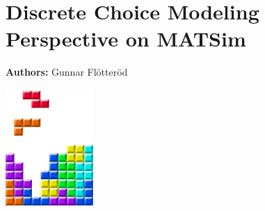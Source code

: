 \chapter{Discrete Choice Modeling Perspective on MATSim }
\label{ch:discretechoice}

\hfill \textbf{Authors:} Gunnar Flötteröd

\begin{center} \includegraphics[width=0.25\textwidth, angle=0]{figures/MATSimBook.png} \end{center}

